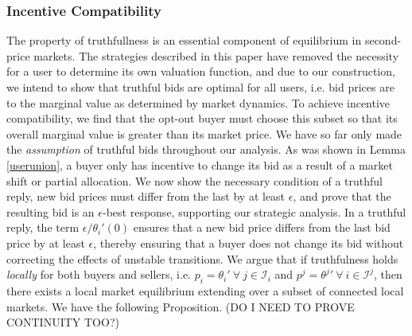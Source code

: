 \documentclass[sigconf, anonymous]{acmart}
\newcommand{\mcI}{\mathcal{I}}
\theoremstyle{definition}
\begin{document}
\subsubsection{Incentive Compatibility}

The property of truthfullness is an essential component of equilibrium in
second-price markets. The strategies described in this paper have removed the
necessity for a user to determine its own valuation function, and due to our
construction, we intend to show that truthful bids are optimal for all users,
i.e. bid prices are to the marginal value as determined by market dynamics. 
To achieve incentive compatibility, we find that the opt-out buyer must choose
this subset so that its overall marginal value is greater than its market price.
We have so far only made the \emph{assumption} of truthful bids throughout our analysis. As was shown in Lemma \ref{userunion}, a buyer only
has incentive to change its bid as a result of a market shift or partial
allocation. We now show the necessary condition of a truthful reply, new bid
prices must differ from the last by at least $\epsilon$, and prove that the
resulting bid is an $\epsilon$-best response, supporting our strategic analysis.
In a truthful reply, the term $\epsilon/\theta_i'(0)$
ensures that a new bid price differs from the last bid price by at least
$\epsilon$, thereby ensuring that a buyer does not change its bid without
correcting the effects of unstable transitions.
We argue that if truthfulness holds \emph{locally} for both buyers and sellers, i.e. $p_i ={\theta_i}' \
\forall \ j \in \mcI_i$ and $p^j = {\theta^j}' \ \forall \ i \in\mcI^j$, then
there exists a local market equilibrium extending over a subset of connected
local markets. We have the following Proposition. 
(DO I NEED TO PROVE CONTINUITY TOO?)
\end{document}
